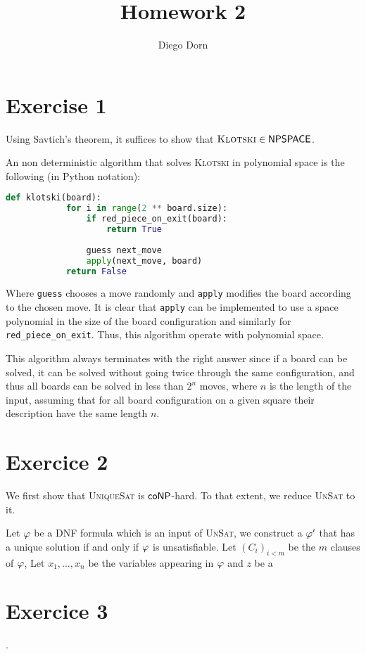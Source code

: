 

\title{Homework 2}
\author{Diego Dorn}

\newcommand{\klotski}{\textsc{Klotski}\xspace}
\newcommand{\UniqueSAT}{\textsc{UniqueSat}\xspace}
\newcommand{\UnSAT}{\textsc{UnSat}\xspace}


    \maketitle

    \section*{Exercise 1}
    Using Savtich's theorem, it suffices to show that 
    $\klotski \in \NPSPACE$. 

    An non deterministic algorithm that solves \klotski
    in polynomial space is the following (in Python notation):

    \begin{lstlisting}[language=python]
        def klotski(board):
            for i in range(2 ** board.size):
                if red_piece_on_exit(board): 
                    return True
            
                guess next_move
                apply(next_move, board)
            return False
    \end{lstlisting}

    Where \texttt{guess} chooses a move randomly and \texttt{apply}
    modifies the board according to the chosen move. It is clear that
    \texttt{apply} can be implemented to use a space polynomial
    in the size of the board configuration and similarly for 
    \texttt{red\_piece\_on\_exit}.
    Thus, this algorithm operate with polynomial space.

    This algorithm always terminates with the right answer since
    if a board can be solved, it can be solved without going twice 
    through the same configuration, and thus all boards can be solved 
    in less than $2^n$ moves, where $n$ is the length of the input, 
    assuming that for all board configuration on a given square
    their description have the same length $n$.

    \section*{Exercice 2}

    We first show that \UniqueSAT is $\mathsf{coNP}$-hard.
    To that extent, we reduce \UnSAT to it.

    Let $\varphi$ be a DNF formula which is an input of \UnSAT,
    we construct a $\varphi'$ that has a unique solution if and only if 
    $\varphi$ is unsatisfiable. 
    Let $(C_i)_{i < m}$ be the $m$ clauses of $\varphi$,
    Let $x_1, \dots, x_n$ be the variables
    appearing in $\varphi$ and $z$ be a 

    \section*{Exercice 3}

    \newpage
    .

